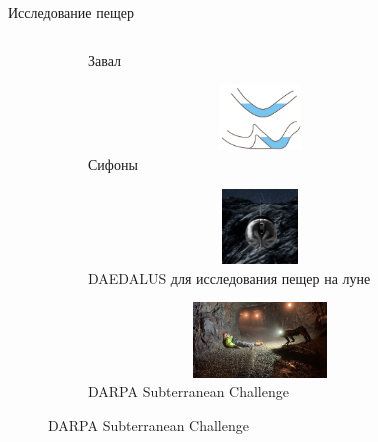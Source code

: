 \begin{frame}[t]{Исследование пещер}
\begin{columns}[T,onlytextwidth]
\begin{column}{0.37\textwidth}
\begin{figure}[H]
\begin{subfigure}{0.49\textwidth}
                    \caption*{Завал}
                \end{subfigure}
                \begin{subfigure}{0.49\textwidth}
                    \centering\includegraphics[height=1.75cm,width=1\textwidth,keepaspectratio]{../images/surface_types/siphon.png}
                    \caption*{Сифоны}
                \end{subfigure}
            
                \begin{subfigure}{0.49\textwidth}
                    \centering\includegraphics[height=2cm,width=1\textwidth,keepaspectratio]{../images/slides/daedalus.jpg}
                    \caption*{DAEDALUS для исследования пещер на луне}
                \end{subfigure}
                \begin{subfigure}{0.49\textwidth}
                    \centering\includegraphics[height=2cm,width=1\textwidth,keepaspectratio]{../images/open_cave.jpg}
                    \caption*{DARPA Subterranean Challenge}
                \end{subfigure}
            \end{figure}
        \end{column}
    \end{columns}
\end{frame}


